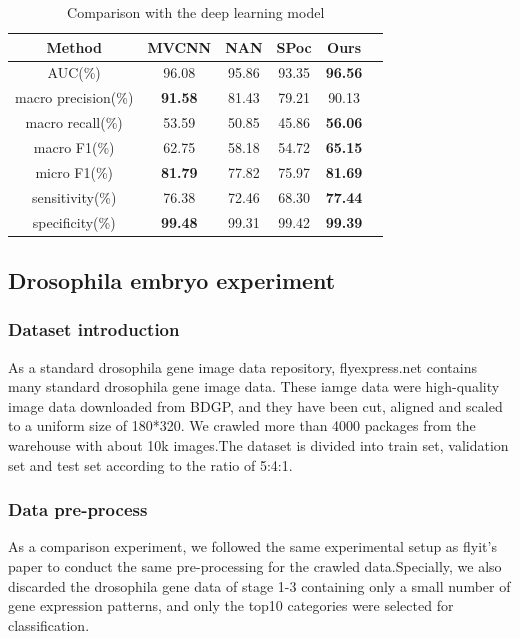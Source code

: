\documentclass[10pt,twocolumn,letterpaper]{article}
\begin{document}
\begin{table}
\normalsize
\begin{center}
\begin{tabular}{|c|c|c|c|c|c|}
\hline
Method & MVCNN & NAN & SPoc & Ours \\
\hline\hline
AUC(\%) & 96.08 & 95.86 & 93.35 & \textbf{96.56} \\
macro precision(\%) & \textbf{91.58} & 81.43 & 79.21 & 90.13 \\
macro recall(\%) & 53.59 & 50.85 & 45.86 & \textbf{56.06}\\
macro F1(\%) & 62.75 & 58.18 & 54.72 & \textbf{65.15} \\
micro F1(\%) & \textbf{81.79} & 77.82 & 75.97 & \textbf{81.69} \\
sensitivity(\%) & 76.38 & 72.46 & 68.30 & \textbf{77.44} \\
specificity(\%) & \textbf{99.48} & 99.31 & 99.42 & \textbf{99.39} \\
\hline
\end{tabular}
\end{center}
\caption{Comparison with the deep learning model}
\end{table}

\subsection{Drosophila embryo experiment}

\subsubsection{Dataset introduction}
As a standard drosophila gene image data repository\cite{ref26}, flyexpress.net contains many standard drosophila gene image data. These iamge data were high-quality image data downloaded from BDGP, and they have been cut, aligned and scaled to a uniform size of 180*320. We crawled more than 4000 packages from the warehouse with about 10k images.The dataset is divided into train set, validation set and test set according to the ratio of 5:4:1.

\subsubsection{Data pre-process}
As a comparison experiment, we followed the same experimental setup as flyit's\cite{ref27} paper to conduct the same pre-processing for the crawled data.Specially, we also discarded the drosophila gene data of stage 1-3 containing only a small number of gene expression patterns, and only the top10 categories were selected for classification.
\end{document}
